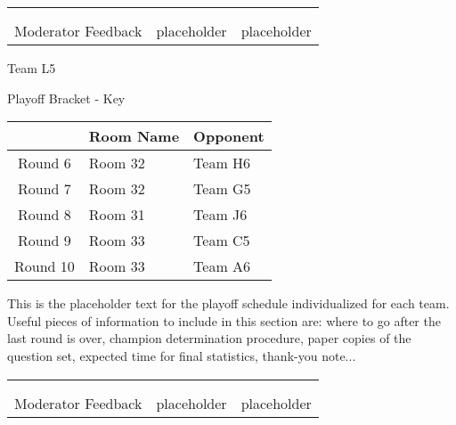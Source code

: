 \documentclass{article}%
\begin{document}
\newline%
%
\begin{tabularx}{\textwidth}{YYY}%
  &  &  \\%
\\%
Moderator Feedback&placeholder&placeholder\\%
\end{tabularx}%
\newpage%
\begin{center}%
\begin{Huge}%
Team L5%
\end{Huge}%
\vspace*{12pt}%
\linebreak%
\begin{Large}%
Playoff Bracket {-} Key%
\end{Large}%
\end{center}%
\vspace*{4pt}%
%
\begin{tabularx}{\textwidth}{|c|Y|Y|}%
\hline%
&Room Name&Opponent\\%
\hline%
Round 6&Room 32&Team H6\\%
Round 7&Room 32&Team G5\\%
Round 8&Room 31&Team J6\\%
Round 9&Room 33&Team C5\\%
Round 10&Room 33&Team A6\\%
\hline%
\end{tabularx}%
\vspace*{30pt}%
\linebreak%
This is the placeholder text for the playoff schedule individualized for each team. Useful pieces of information to include in this section are: where to go after the last round is over, champion determination procedure, paper copies of the question set, expected time for final statistics, thank{-}you note...%
\vspace*{30pt}%
\newline%
%
\begin{tabularx}{\textwidth}{YYY}%
  &  &  \\%
\\%
Moderator Feedback&placeholder&placeholder\\%
\end{tabularx}%
\end{document}
